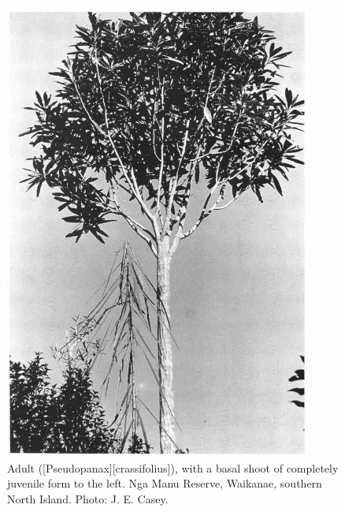 \begin{figure}[htb]
	\centering
	\begin{minipage}[t]{0.482\textwidth}
		\centering
		\includegraphics[width=0.9\textwidth]{graphics/figure20lancewood.jpg}
    	\caption[Adult lancewood]{Adult  ([Pseudopanax][crassifolius]), with a basal shoot of completely juvenile form to the left.
        Nga Manu Reserve, Waikanae, southern North Island.
    	Photo: J. E. Casey.}%
    	\label{fig:20lancewood}
	\end{minipage}\hfill%
	\begin{minipage}[t]{0.498\textwidth}
    	\centering

\end{minipage}
\end{figure}
